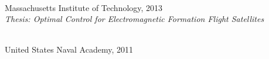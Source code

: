 \begin{enumerate}
    \\
    Massachusetts Institute of Technology, 2013\\
    \emph{Thesis: Optimal Control for Electromagnetic Formation Flight Satellites}

    \\
    United States Naval Academy, 2011
\end{enumerate}
